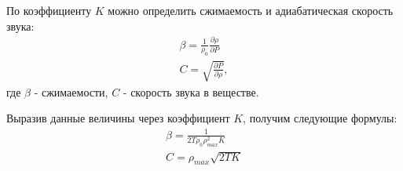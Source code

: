 \documentclass[pdf,hyperref={unicode}]{beamer}
\begin{document}
\begin{frame}
\begin{columns}
\begin{column}{0.45\linewidth}
{\tiny{
По коэффициенту $K$ можно определить сжимаемость и адиабатическая скорость звука:
\begin{equation}
\begin{aligned}
\beta = \frac{1}{\rho_0} \frac{\partial \rho}{\partial P} \\
C = \sqrt{\frac{\partial P}{\partial \rho}},
\end{aligned}
\label{eqCBeta}
\end{equation}
где $\beta$ - сжимаемости, $C$ - скорость звука в веществе.

Выразив данные величины через коэффициент $K$, получим следующие формулы:
\begin{equation}
\begin{aligned}
\beta = \frac{1}{2T\rho_0\rho_{max}^2K}\\
C = \rho_{max}\sqrt{2TK}
\end{aligned}
\label{eqCBetaK}
\end{equation}
}}
\end{column}

\end{columns}
\end{frame}
\end{document}
